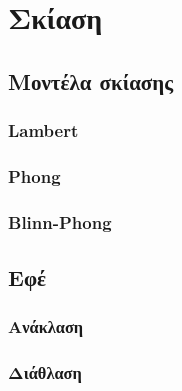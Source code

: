 \chapter{Σκίαση}

\begin{sloppypar}

\section{Μοντέλα σκίασης}

\subsection{Lambert}

\subsection{Phong}

\subsection{Blinn-Phong}

\section{Εφέ}

\subsection{Ανάκλαση}

\subsection{Διάθλαση}

\end{sloppypar}

